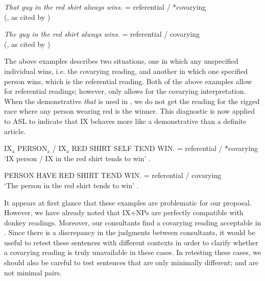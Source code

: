 \documentclass[output=paper,
modfonts
]{langscibook}
\begin{document}
\begin{exe}
	\ex \label{ex:irani:84} \textit{That guy in the red shirt always wins.} = referential / *covarying \\ (\citealt{Nowak2013}, as cited by \citealt{KoulidobrovaLilloMartin2016}) 
	
	\ex \label{ex:irani:85} \textit{The guy in the red shirt always wins.} = referential / covarying \\ (\citealt{Nowak2013}, as cited by \citealt{KoulidobrovaLilloMartin2016}) 
\end{exe}

The above examples describes two situations, one in which any unspecified individual wins, i.e. the covarying reading, and another in which one specified person wins, which is the referential reading. Both of the above examples allow for referential readings; however, only  allows for the covarying interpretation. When the demonstrative \textit{that} is used in , we do not get the reading for the rigged race where any person wearing red is the winner. This diagnostic is now applied to ASL to indicate that IX behaves more like a demonstrative than a definite article. 

\begin{exe}
	\ex \label{ex:irani:86} {IX$_\text{a}$ PERSON$_\text{a}$ / IX$_\text{a}$} RED SHIRT SELF TEND WIN. = referential / *covarying\\ 
	`IX person / IX in the red shirt tends to win' \citep[14]{KoulidobrovaLilloMartin2016}.
	
	\ex \label{ex:irani:87} PERSON HAVE RED SHIRT TEND WIN. = referential / covarying \\
	`The person in the red shirt tends to win’ \citep[14]{KoulidobrovaLilloMartin2016}.
\end{exe}

\noindent It appears at first glance that these examples are problematic for our proposal. However, we have already noted that IX+NPs are perfectly compatible with donkey readings. Moreover, our consultants find a covarying reading acceptable in . Since there is a discrepancy in the judgments between consultants, it would be useful to retest these sentences with different contexts in order to clarify whether a covarying reading is truly unavailable in these cases. In retesting these cases, we should also be careful to test sentences that are only minimally different;  and  are not minimal pairs. 
\end{document}
